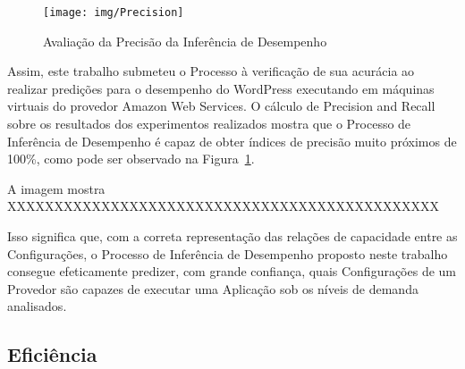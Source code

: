 \begin{figure}[hbt]
  \caption{\label{fig:avaliacao_precisao}Avaliação da Precisão da Inferência de Desempenho}
  \begin{center}
    \texttt{[image: img/Precision]}
  \end{center}
\end{figure}

Assim, este trabalho submeteu o Processo à verificação de sua acurácia ao realizar
predições para o desempenho do WordPress executando em máquinas virtuais do provedor
Amazon Web Services. O cálculo de Precision and Recall~\cite{powers2011evaluation} 
sobre os resultados dos experimentos realizados mostra que o Processo de Inferência 
de Desempenho é capaz de obter índices de precisão muito próximos de 100\%, como 
pode ser observado na Figura~\ref{fig:avaliacao_precisao}. 

A imagem mostra XXXXXXXXXXXXXXXXXXXXXXXXXXXXXXXXXXXXXXXXXXXXXX

Isso significa que, com a correta representação das relações de capacidade entre
as Configurações, o Processo de Inferência de Desempenho proposto neste trabalho
consegue efeticamente predizer, com grande confiança, quais Configurações de um 
Provedor são capazes de executar uma Aplicação sob os níveis de demanda analisados. 

\subsection{Eficiência}
\label{subsec:resultados_eficiencia}


